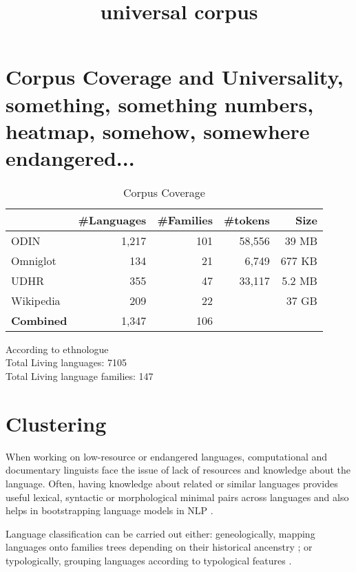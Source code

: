 \documentclass[11pt]{article}
\title{\textbf{universal corpus}}
\date{}
\begin{document}
\maketitle

\section{Corpus Coverage and Universality, something, something numbers, heatmap, somehow, somewhere endangered...}
\begin{table}[h!]
\centering
    \begin{tabular}{l|rrrr}
    ~         				& \#Languages & \#Families 	&\#tokens		& Size	\\ \hline
    ODIN      				& 1,217      & 101       		& 58,556		& 39 MB		\\
    Omniglot  				& 134        & 21        		&	6,749			& 677 KB	\\
    UDHR      				& 355        & 47        		&	33,117		& 5.2 MB	\\
    Wikipedia 				& 209        & 22       		&						& 37 GB		\\ \hline
    \textbf{Combined}	& 1,347			 & 106 
    \end{tabular}
\caption{Corpus Coverage}
\end{table}

\noindent
According to ethnologue \\
Total Living languages: 7105 \\
Total Living language families: 147 \\

\newpage
\section{Clustering}
When working on low-resource or endangered languages, computational and documentary linguists face the issue of lack of resources and knowledge about the language. Often, having knowledge about related or similar languages provides useful lexical, syntactic or morphological minimal pairs across languages and also helps in bootstrapping language models in NLP \cite{yarowsky:ngai:2001,xia2007multilingual}.

Language classification can be carried out either: geneologically, mapping languages onto families trees depending on their historical ancenstry \cite{swadesh1952,starostin2010}; or typologically, grouping languages according to typological features \cite{georgi2010wals,daume2009}.
\end{document}
